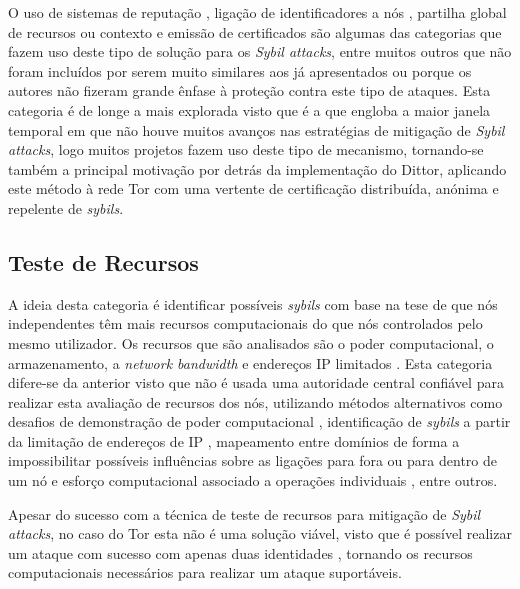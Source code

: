 O uso de sistemas de reputação \cite{dragovic2003xenotrust}, ligação de identificadores a nós \cite{mathur2004securing, martin2004framework, roscoe2002transaction, yang2004hours, zhao2004tapestry}, partilha global de recursos ou contexto \cite{narasimha2003utility, ngan2004incentives, karlof2003secure} e emissão de certificados \cite{saxena2003admission} são algumas das categorias que fazem uso deste tipo de solução para os \textit{Sybil attacks}, entre muitos outros que não foram incluídos por serem muito similares aos já apresentados ou porque os autores não fizeram grande ênfase à proteção contra este tipo de ataques. Esta categoria é de longe a mais explorada visto que é a que engloba a maior janela temporal em que não houve muitos avanços nas estratégias de mitigação de \textit{Sybil attacks}, logo muitos projetos fazem uso deste tipo de mecanismo, tornando-se também a principal motivação por detrás da implementação do Dittor, aplicando este método à rede Tor com uma vertente de certificação distribuída, anónima e repelente de \textit{sybils}.

\subsection{Teste de Recursos}
\label{ssec:teste_recursos}

A ideia desta categoria é identificar possíveis \textit{sybils} com base na tese de que nós independentes têm mais recursos computacionais do que nós controlados pelo mesmo utilizador. Os recursos que são analisados são o poder computacional, o armazenamento, a \textit{network bandwidth} e endereços IP limitados \cite{levine2006survey}. Esta categoria difere-se da anterior visto que não é usada uma autoridade central confiável para realizar esta avaliação de recursos dos nós, utilizando métodos alternativos como desafios de demonstração de poder computacional \cite{aspnes2005exposing, goel2003herbivore}, identificação de \textit{sybils} a partir da limitação de endereços de IP \cite{cornelli2002implementing}, mapeamento entre domínios de forma a impossibilitar possíveis influências sobre as ligações para fora ou para dentro de um nó \cite{freedman2002tarzan} e esforço computacional associado a operações individuais \cite{maniatis2003preserving}, entre outros.

Apesar do sucesso com a técnica de teste de recursos para mitigação de \textit{Sybil attacks}, no caso do Tor esta não é uma solução viável, visto que é possível realizar um ataque com sucesso com apenas duas identidades \cite{levine2006survey}, tornando os recursos computacionais necessários para realizar um ataque suportáveis.

